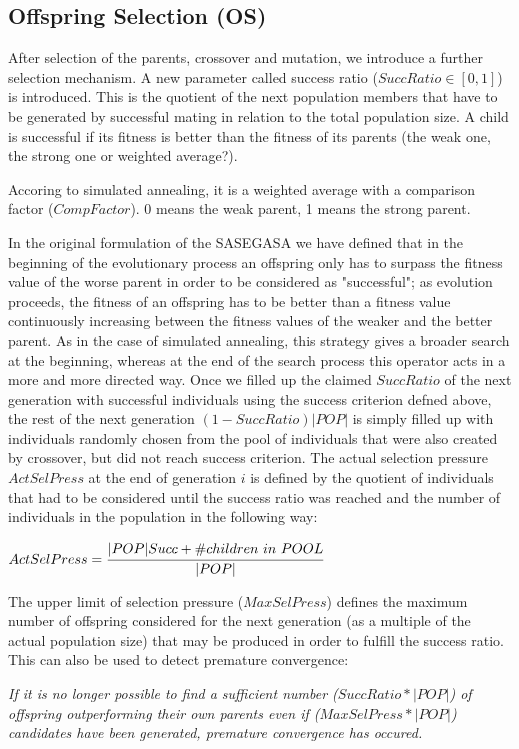 \documentclass[12pt]{article}
\begin{document}
\subsection{Offspring Selection (OS)}
After selection of the parents, crossover and mutation, we introduce a further selection mechanism. A new parameter called success ratio ($SuccRatio \in [0,1]$) is introduced. This is the quotient of the next population members that have to be generated by successful mating in relation to the total population size. A child is successful if its fitness is better than the fitness of its parents (the weak one, the strong one or weighted average?).

Accoring to simulated annealing, it is a weighted average with a comparison factor ($CompFactor$). 0 means the weak parent, 1 means the strong parent.

In the original formulation of the SASEGASA we have defined that in the beginning of the evolutionary process an offspring only has to surpass the fitness value of the worse parent in order to be considered as "successful"; as evolution proceeds, the fitness of an offspring has to be better than a fitness value continuously increasing between the fitness values of the weaker and the better parent. As in the case of simulated annealing, this strategy gives a broader search at the beginning, whereas at the end of the search process this operator acts in a more and more directed way. Once we filled up the claimed $SuccRatio$ of the next generation with successful individuals using the success criterion defned above, the rest of the next generation $(1-SuccRatio)|POP|$ is simply filled up with individuals randomly chosen from the pool of individuals that were also created by crossover, but did not reach success criterion. The actual selection pressure $ActSelPress$ at the end of generation $i$ is defined by the quotient of individuals that had to be considered until the success ratio was reached and the number of individuals in the population in the following way:
\begin{center}
$ActSelPress = \cfrac{|POP|Succ+\#children\ in\ POOL}{|POP|}$
\end{center}
The upper limit of selection pressure ($MaxSelPress$) defines the maximum number of offspring considered for the next generation (as a multiple of the actual population size) that may be produced in order to fulfill the success ratio. This can also be used to detect premature convergence:


\textit{If it is no longer possible to find a sufficient number ($SuccRatio*|POP|$) of offspring outperforming their own parents even if ($MaxSelPress*|POP|$) candidates have been generated, premature convergence has occured.}
\end{document}
